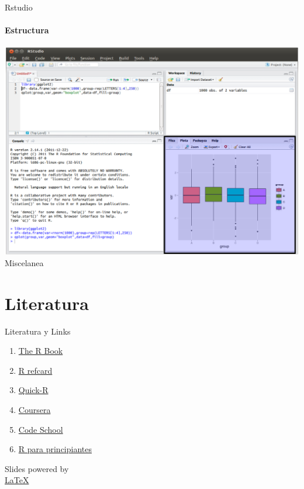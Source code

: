 \documentclass[12pt]{beamer}
\begin{document}
\begin{frame}{Rstudio}
\framesubtitle{Estructura}
\begin{center}
\includegraphics[scale=0.32]{images/rstudio4}\\
\footnotesize{Miscelanea}
\end{center}
\end{frame}

\section{Literatura}
\begin{frame}{Literatura y Links}
\begin{enumerate}[<+->]
\item \href{https://archive.org/details/TheRBook}{The R Book}
\item \href{https://cran.r-project.org/doc/contrib/Short-refcard.pdf}{R refcard}
\item \href{http://www.statmethods.net/}{Quick-R}
\item \href{https://www.coursera.org/learn/intro-data-science-programacion-estadistica-r/}{Coursera}
\item \href{https://www.codeschool.com/courses/try-r}{Code School}
\item \href{https://cran.r-project.org/doc/contrib/rdebuts_es.pdf}{R para principiantes}

\end{enumerate}
\end{frame}

\begin{frame}
\begin{center}
\begin{LARGE}
Slides powered by\\
\href{https://latex-project.org/intro.html}{\LaTeX}
\end{LARGE}
\end{center}
\end{frame}
\end{document}
